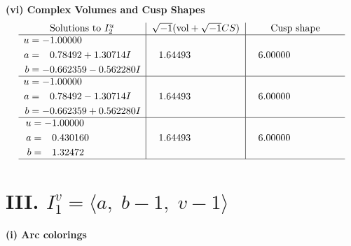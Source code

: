 \documentclass[1p]{elsarticle_modified}
\theoremstyle{definition}
\newcommand{\I}{\sqrt{-1}}
\begin{document}
\newpage\flushleft \textbf{(vi) Complex Volumes and Cusp Shapes}
$$\begin{array}{c|c|c}  
\text{Solutions to }I^u_{2}& \I (\text{vol} + \sqrt{-1}CS) & \text{Cusp shape}\\
 \hline 
\begin{aligned}
u &= -1.00000\phantom{ +0.000000I} \\
a &= \phantom{-}0.78492 + 1.30714 I \\
b &= -0.662359 - 0.562280 I\end{aligned}
 & \phantom{-}1.64493\phantom{ +0.000000I} & \phantom{-}6.00000\phantom{ +0.000000I} \\ \hline\begin{aligned}
u &= -1.00000\phantom{ +0.000000I} \\
a &= \phantom{-}0.78492 - 1.30714 I \\
b &= -0.662359 + 0.562280 I\end{aligned}
 & \phantom{-}1.64493\phantom{ +0.000000I} & \phantom{-}6.00000\phantom{ +0.000000I} \\ \hline\begin{aligned}
u &= -1.00000\phantom{ +0.000000I} \\
a &= \phantom{-}0.430160\phantom{ +0.000000I} \\
b &= \phantom{-}1.32472\phantom{ +0.000000I}\end{aligned}
 & \phantom{-}1.64493\phantom{ +0.000000I} & \phantom{-}6.00000\phantom{ +0.000000I}\\
 \hline 
 \end{array}$$\newpage\newpage\renewcommand{\arraystretch}{1}
\centering \section*{III. $I^v_{1}= \langle a,\;b-1,\;v-1 \rangle$}
\flushleft \textbf{(i) Arc colorings}\\
\end{document}
